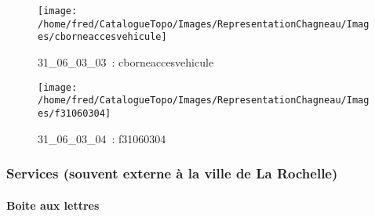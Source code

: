 \documentclass[12pt,titlepage]{book}
\begin{document}
\begin{figure}[h!]
  \begin{minipage}[t]{3cm}
    \begin{center}
      \texttt{[image: /home/fred/CatalogueTopo/Images/RepresentationChagneau/Images/cborneaccesvehicule]}
      \caption[~31\_06\_03\_03]{\small{31\_06\_03\_03~:} \tiny{cborneaccesvehicule}}\label{cborneaccesvehicule}
    \end{center}
  \end{minipage}
  \begin{minipage}[t]{3cm}
    \begin{center}
      \texttt{[image: /home/fred/CatalogueTopo/Images/RepresentationChagneau/Images/f31060304]}
      \caption[~31\_06\_03\_04]{\small{31\_06\_03\_04~:} \tiny{f31060304}}\label{f31060304}
    \end{center}
  \end{minipage}
\end{figure}

\subsubsection{\large Services (souvent externe à la ville de La Rochelle)}
\paragraph{Boite aux lettres}
\noindent
\vspace{\baselineskip}
\end{document}
